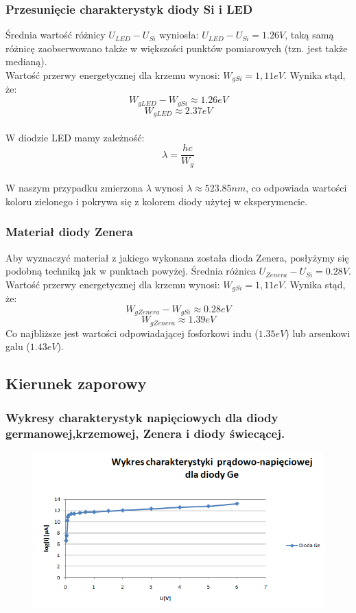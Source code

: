 \documentclass[11pt]{article}
\begin{document}
\subsubsection{Przesunięcie charakterystyk diody Si i LED}
Średnia wartość różnicy $U_{LED} - U_{Si}$ wyniosła: $U_{LED} - U_{Si} = 1.26V$, taką samą różnicę zaobserwowano także w większości punktów pomiarowych (tzn. jest także medianą).\\
\newline
Wartość przerwy energetycznej dla krzemu wynosi: $W_{gSi} = 1,11eV$. Wynika stąd, że:
$$W_{gLED} - W_{gSi} \approx 1.26eV$$
$$W_{gLED} \approx 2.37eV$$
\\
W diodzie LED mamy zależność:
$$\lambda = \frac{hc}{W_{g}}$$
\\
W naszym przypadku zmierzona $\lambda$ wynosi $\lambda \approx 523.85nm$, co odpowiada wartości koloru zielonego i pokrywa się z kolorem diody użytej w eksperymencie.
\subsubsection{Materiał diody Zenera}
Aby wyznaczyć materiał z jakiego wykonana została dioda Zenera, posłyżymy się podobną techniką jak w punktach powyżej. Średnia różnica $U_{Zenera} - U_{Si} = 0.28V$. Wartość przerwy energetycznej dla krzemu wynosi: $W_{gSi} = 1,11eV$. Wynika stąd, że:
$$W_{gZenera} - W_{gSi} \approx 0.28eV$$
$$W_{gZenera} \approx 1.39eV$$
Co najbliższe jest wartości odpowiadającej fosforkowi indu ($1.35eV$) lub arsenkowi galu ($1.43eV$).
\subsection{Kierunek zaporowy}
\subsubsection{Wykresy charakterystyk napięciowych dla diody germanowej,krzemowej, Zenera i diody świecącej. }

\begin{figure}[H]
    \centering
    \includegraphics[height=0.27\paperheight]{graph3}
    \label{fig:graph3}
\end{figure}
\end{document}
